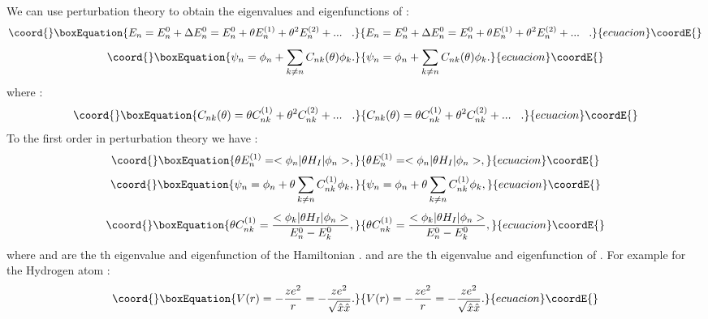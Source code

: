 \documentclass[a4paper,a4paper]{article}
\begin{document}
We can use perturbation theory to
obtain the eigenvalues and eigenfunctions of \coordHE{} :
\begin{equation}\coord{}\boxEquation{
E_{n}=E^{0}_{n}+\Delta E^{0}_{n}=E^{0}_{n}+\theta E^{(1)}_{n}+\theta^{2}
E^{(2)}_{n}+...\hspace{.3cm} .
}{
E_{n}=E^{0}_{n}+\Delta E^{0}_{n}=E^{0}_{n}+\theta E^{(1)}_{n}+\theta^{2}
E^{(2)}_{n}+...\hspace{.3cm} .
}{ecuacion}\coordE{}\end{equation}
\begin{equation}\coord{}\boxEquation{
\psi_{n}=\phi_{n}+ \sum_{k\neq n}C_{nk}(\theta)\phi_{k} .
}{
\psi_{n}=\phi_{n}+ \sum_{k\neq n}C_{nk}(\theta)\phi_{k} .
}{ecuacion}\coordE{}\end{equation}
where :
\begin{equation}\coord{}\boxEquation{
C_{nk}(\theta)=\theta C^{(1)}_{nk}+\theta^{2} C^{(2)}_{nk}+...\hspace{.3cm}
.
}{
C_{nk}(\theta)=\theta C^{(1)}_{nk}+\theta^{2} C^{(2)}_{nk}+...\hspace{.3cm}
.
}{ecuacion}\coordE{}\end{equation}
To the first order in perturbation theory we have :
\begin{equation}\coord{}\boxEquation{
\theta E^{(1)}_{n}= <\phi_{n}|\theta H_{I} |\phi_{n}> ,
}{
\theta E^{(1)}_{n}= <\phi_{n}|\theta H_{I} |\phi_{n}> ,
}{ecuacion}\coordE{}\end{equation}
\begin{equation}\coord{}\boxEquation{
\psi_{n}=\phi_{n}+\theta \sum_{k\neq n}C^{(1)}_{nk}\phi_{k} ,
}{
\psi_{n}=\phi_{n}+\theta \sum_{k\neq n}C^{(1)}_{nk}\phi_{k} ,
}{ecuacion}\coordE{}\end{equation}
\begin{equation}\coord{}\boxEquation{
\theta C^{(1)}_{nk}=\frac{<\phi_{k}|\theta
H_{I}|\phi_{n}>}{E^{0}_{n}-E_{k}^{0}} ,
}{
\theta C^{(1)}_{nk}=\frac{<\phi_{k}|\theta
H_{I}|\phi_{n}>}{E^{0}_{n}-E_{k}^{0}} ,
}{ecuacion}\coordE{}\end{equation}
where \coordHE{} and \coordHE{} are the \coordHE{}th eigenvalue and
eigenfunction of the Hamiltonian \coordHE{}. \coordHE{} and \coordHE{} are
the \coordHE{}th eigenvalue and eigenfunction of \coordHE{}. For example
for the Hydrogen atom :
\begin{equation}\coord{}\boxEquation{
V(r)=-\frac{ze^{2}}{r}=-\frac{ze^{2}}{\sqrt{\hat{x}\hat{x}}} .
}{
V(r)=-\frac{ze^{2}}{r}=-\frac{ze^{2}}{\sqrt{\hat{x}\hat{x}}} .
}{ecuacion}\coordE{}\end{equation}
\end{document}
